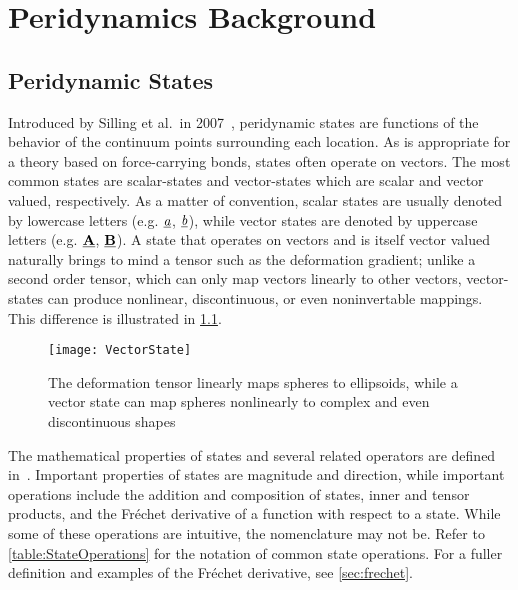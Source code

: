 \chapter{Peridynamics Background}

\section{Peridynamic States}
%
Introduced by Silling et al.\ in 2007~\cite{silling2007peridynamic}, peridynamic states are functions of the behavior of the continuum points surrounding each location.
As is appropriate for a theory based on force-carrying bonds, states often operate on vectors.
The most common states are scalar-states and vector-states which are scalar and vector valued, respectively.
As a matter of convention, scalar states are usually denoted by lowercase letters (e.g. $\sstate{a}{}{}$, $\sstate{b}{}{}$), while vector states are denoted by uppercase letters (e.g. $\vstate{A}{}{}$, $\vstate{B}{}{}$).
A state that operates on vectors and is itself vector valued naturally brings to mind a  tensor such as the deformation gradient;
unlike a second order tensor, which can only map vectors linearly to other vectors, vector-states can produce nonlinear, discontinuous, or even noninvertable mappings.  
This difference is illustrated in \cref{fig:VectorState}.
%
\begin{figure}[h]
  \centering
\texttt{[image: VectorState]}
\caption[Deformation tensor vs. deformation vector state]{The deformation tensor linearly maps spheres to ellipsoids, while a vector state can map spheres nonlinearly to complex and even discontinuous shapes \cite{silling2007peridynamic}}
\label{fig:VectorState}
\end{figure}
%

The mathematical properties of states and several related operators are defined in~\cite{silling2007peridynamic}.
Important properties of states are magnitude and direction, while important operations include the addition and composition of states, inner and tensor products, and the Fr\'{e}chet derivative of a function with respect to a state.
While some of these operations are intuitive, the nomenclature may not be.
Refer to \cref{table:StateOperations} for the notation of common state operations.
For a fuller  definition and examples of the Fr\'echet derivative, see \cref{sec:frechet}.


